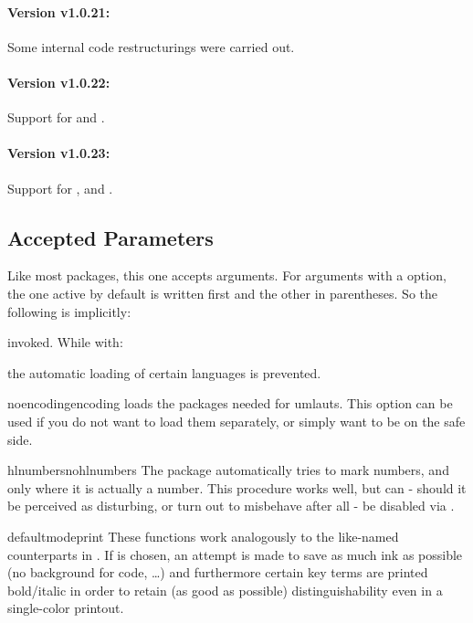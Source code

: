 \documentclass{sopra-base}
\begin{document}
\paragraph{Version v1.0.21:}
Some internal code restructurings were carried out.
\paragraph{Version v1.0.22:}
Support for  and .
\paragraph{Version v1.0.23:}
Support for ,  and .

\subsection{Accepted Parameters}
    Like most packages, this one accepts arguments.
    For arguments with a  option, the one active by default is written first and the other in parentheses.
    So the following is implicitly:
\begin{plainlatex}
\usepackage[noencoding,hlnumbers,loadlangs,guardspace]{sopra-listings}
\end{plainlatex}
    invoked. While with:
\begin{plainlatex}
\usepackage[noloadlangs]{sopra-listings}
\end{plainlatex}
    the automatic loading of certain languages is prevented.

    \begin{argument}{noencoding}{encoding}
        \label{mrk:encoding} loads the packages needed for umlauts. This option can be used if you do not want to load them separately, or simply want to be on the safe side.
    \end{argument}

    \begin{argument}{hlnumbers}{nohlnumbers}
        The package automatically tries to mark numbers, and only where it is actually a number. This procedure works well, but can - should it be perceived as disturbing, or turn out to misbehave after all - be disabled via .
    \end{argument}

    \begin{argument}{defaultmode}{print}
        These functions work analogously to the like-named counterparts in . If  is chosen, an attempt is made to save as much ink as possible (no background for code, \ldots) and furthermore certain
        key terms are printed bold/italic in order to retain
        (as good as possible) distinguishability even in a single-color printout.
    \end{argument}
\end{document}
